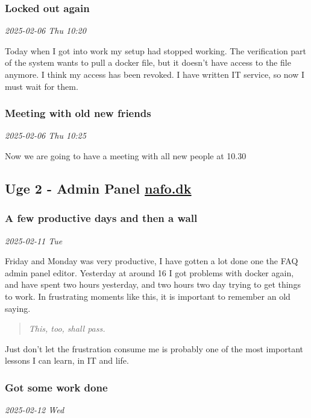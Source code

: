 \documentclass[../main.tex]{subfiles}
\begin{document}
\subsubsection{\textbf{Locked out again}}

\textit{2025-02-06 Thu 10:20}

Today when I got into work my setup had stopped working. The verification part of the system wants to pull a docker file, but it doesn't have access to the file anymore. I think my access has been revoked. I have written IT service, so now I must wait for them.

\subsubsection{Meeting with old new friends}

\textit{2025-02-06 Thu 10:25}

Now we are going to have a meeting with all new people at 10.30 

\subsection{Uge 2 - Admin Panel \href{https://www.nationaltforsoegsoverblik.dk/}{nafo.dk}}
\subsubsection{\textbf{A few productive days and then a wall}}

\textit{2025-02-11 Tue}

Friday and Monday was very productive, I have gotten a lot done one the FAQ admin panel editor. Yesterday at around 16 I got problems with docker again, and have spent two hours yesterday, and two hours two day trying to get things to work. In frustrating moments like this, it is important to remember an old saying.

\begin{quote}
\emph{This, too, shall pass.}
\end{quote}

Just don't let the frustration consume me is probably one of the most important lessons I can learn, in IT and life.

\subsubsection{\textbf{Got some work done}}

\textit{2025-02-12 Wed}
\end{document}
